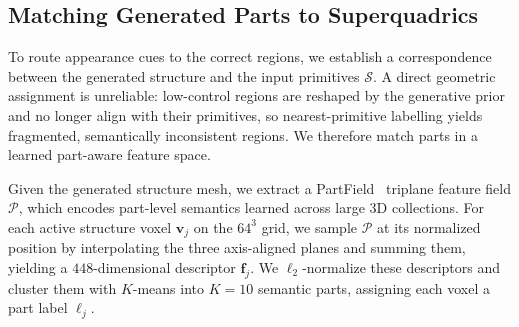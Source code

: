



\subsection{Matching Generated Parts to Superquadrics}
\label{sec:part_matching}
To route appearance cues to the correct regions, we establish a correspondence between the generated structure and the input primitives $\mathcal{S}$. A direct geometric assignment is unreliable: low-control regions are reshaped by the generative prior and no longer align with their primitives, so nearest-primitive labelling yields fragmented, semantically inconsistent regions. We therefore match parts in a learned part-aware feature space.

Given the generated structure mesh, we extract a PartField~\cite{liu2025partfield} triplane feature field $\mathcal{P}$, which encodes part-level semantics learned across large 3D collections. For each active structure voxel $\mathbf{v}_j$ on the $64^3$ grid, we sample $\mathcal{P}$ at its normalized position by interpolating the three axis-aligned planes and summing them, yielding a $448$-dimensional descriptor $\mathbf{f}_j$. We $\ell_2$-normalize these descriptors and cluster them with $K$-means into $K{=}10$ semantic parts, assigning each voxel a part label $\ell_j$.

